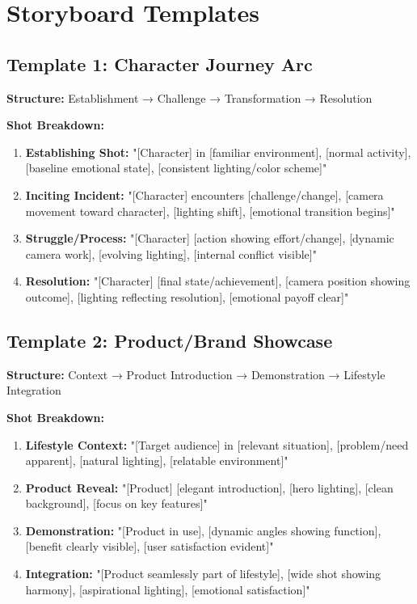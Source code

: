 \section*{Storyboard Templates}

\subsection*{Template 1: Character Journey Arc}
\textbf{Structure:} Establishment → Challenge → Transformation → Resolution

\textbf{Shot Breakdown:}
\begin{enumerate}
\item \textbf{Establishing Shot:} "[Character] in [familiar environment], [normal activity], [baseline emotional state], [consistent lighting/color scheme]"
\item \textbf{Inciting Incident:} "[Character] encounters [challenge/change], [camera movement toward character], [lighting shift], [emotional transition begins]"
\item \textbf{Struggle/Process:} "[Character] [action showing effort/change], [dynamic camera work], [evolving lighting], [internal conflict visible]"
\item \textbf{Resolution:} "[Character] [final state/achievement], [camera position showing outcome], [lighting reflecting resolution], [emotional payoff clear]"
\end{enumerate}

\subsection*{Template 2: Product/Brand Showcase}
\textbf{Structure:} Context → Product Introduction → Demonstration → Lifestyle Integration

\textbf{Shot Breakdown:}
\begin{enumerate}
\item \textbf{Lifestyle Context:} "[Target audience] in [relevant situation], [problem/need apparent], [natural lighting], [relatable environment]"
\item \textbf{Product Reveal:} "[Product] [elegant introduction], [hero lighting], [clean background], [focus on key features]"
\item \textbf{Demonstration:} "[Product in use], [dynamic angles showing function], [benefit clearly visible], [user satisfaction evident]"
\item \textbf{Integration:} "[Product seamlessly part of lifestyle], [wide shot showing harmony], [aspirational lighting], [emotional satisfaction]"
\end{enumerate}

